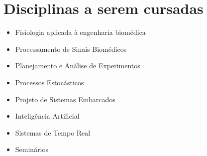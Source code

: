 \section{Disciplinas a serem cursadas}

\begin{itemize}
    \item Fisiologia aplicada à engenharia biomédica
    \item Processamento de Sinais Biomédicos
    \item Planejamento e Análise de Experimentos
    \item Processos Estocásticos
    \item Projeto de Sistemas Embarcados
    \item Inteligência Artificial
    \item Sistemas de Tempo Real
    \item Seminários
\end{itemize}